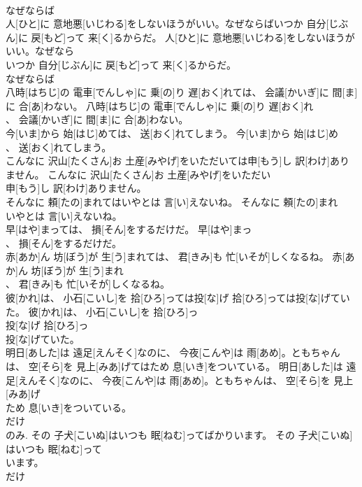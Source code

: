 \documentclass[8pt]{extreport}
\begin{document}
\begin{CJK}{UTF8}{min}
\\	なぜならば
\\	人[ひと]に 意地悪[いじわる]をしないほうがいい。なぜならばいつか 自分[じぶん]に 戻[もど]って 来[く]るからだ。	人[ひと]に 意地悪[いじわる]をしないほうがいい。なぜなら
\\	いつか 自分[じぶん]に 戻[もど]って 来[く]るからだ。	
\\	なぜならば
\\	八時[はちじ]の 電車[でんしゃ]に 乗[の]り 遅[おく]れては、 会議[かいぎ]に 間[ま]に 合[あ]わない。	八時[はちじ]の 電車[でんしゃ]に 乗[の]り 遅[おく]れ
\\	、 会議[かいぎ]に 間[ま]に 合[あ]わない。	
\\	今[いま]から 始[はじ]めては、 送[おく]れてしまう。	今[いま]から 始[はじ]め
\\	、 送[おく]れてしまう。	
\\	こんなに 沢山[たくさん]お 土産[みやげ]をいただいては申[もう]し 訳[わけ]ありません。	こんなに 沢山[たくさん]お 土産[みやげ]をいただい
\\	申[もう]し 訳[わけ]ありません。	
\\	そんなに 頼[たの]まれてはいやとは 言[い]えないね。	そんなに 頼[たの]まれ
\\	いやとは 言[い]えないね。	
\\	早[はや]まっては、 損[そん]をするだけだ。	早[はや]まっ
\\	、 損[そん]をするだけだ。	
\\	赤[あか]ん 坊[ぼう]が 生[う]まれては、 君[きみ]も 忙[いそが]しくなるね。	赤[あか]ん 坊[ぼう]が 生[う]まれ
\\	、 君[きみ]も 忙[いそが]しくなるね。	
\\	彼[かれ]は、 小石[こいし]を 拾[ひろ]っては投[な]げ 拾[ひろ]っては投[な]げていた。	彼[かれ]は、 小石[こいし]を 拾[ひろ]っ
\\	投[な]げ 拾[ひろ]っ
\\	投[な]げていた。	
\\	明日[あした]は 遠足[えんそく]なのに、 今夜[こんや]は 雨[あめ]。ともちゃんは、 空[そら]を 見上[みあ]げてはため 息[いき]をついている。	明日[あした]は 遠足[えんそく]なのに、 今夜[こんや]は 雨[あめ]。ともちゃんは、 空[そら]を 見上[みあ]げ
\\	ため 息[いき]をついている。	
\\	だけ 
\\	のみ.	その 子犬[こいぬ]はいつも 眠[ねむ]ってばかりいます。	その 子犬[こいぬ]はいつも 眠[ねむ]って
\\	います。	
\\	だけ 

\end{CJK}
\end{document}
